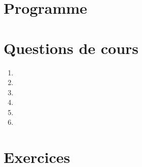 \documentclass[12pt,french]{report}
\begin{document}
\begin{spacing}{1.2}
\section{Programme}




\section{Questions de cours}


\begin{enumerate}
\item 

\item 

\item 

\item 

\item 

\item 

\end{enumerate}


\section{Exercices}
\label{exo1}
\begin{Exercice}[]%





\end{Exercice}

\label{exo2}
\medskip
\begin{Exercice}[]%



\end{Exercice}
\end{spacing}
\end{document}
